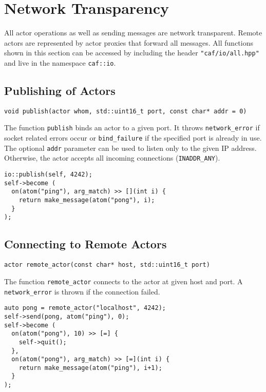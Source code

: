 \section{Network Transparency}

All actor operations as well as sending messages are network transparent.
Remote actors are represented by actor proxies that forward all messages.
All functions shown in this section can be accessed by including the header \lstinline^"caf/io/all.hpp"^ and live in the namespace \lstinline^caf::io^.

\subsection{Publishing of Actors}

\begin{lstlisting}
void publish(actor whom, std::uint16_t port, const char* addr = 0)
\end{lstlisting}

The function \lstinline^publish^ binds an actor to a given port.
It throws \lstinline^network_error^ if socket related errors occur or \lstinline^bind_failure^ if the specified port is already in use.
The optional \lstinline^addr^ parameter can be used to listen only to the given IP address.
Otherwise, the actor accepts all incoming connections (\lstinline^INADDR_ANY^).

\begin{lstlisting}
io::publish(self, 4242);
self->become (
  on(atom("ping"), arg_match) >> [](int i) {
    return make_message(atom("pong"), i);
  }
);
\end{lstlisting}

\subsection{Connecting to Remote Actors}

\begin{lstlisting}
actor remote_actor(const char* host, std::uint16_t port)
\end{lstlisting}

The function \lstinline^remote_actor^ connects to the actor at given host and port.
A \lstinline^network_error^ is thrown if the connection failed.

\begin{lstlisting}
auto pong = remote_actor("localhost", 4242);
self->send(pong, atom("ping"), 0);
self->become (
  on(atom("pong"), 10) >> [=] {
    self->quit();
  },
  on(atom("pong"), arg_match) >> [=](int i) {
    return make_message(atom("ping"), i+1);
  }
);
\end{lstlisting}
